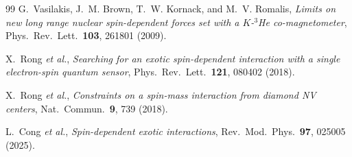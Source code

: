 \documentclass[12pt,a4paper]{report}
\begin{document}
\begin{thebibliography}{99}
G.~Vasilakis, J.~M. Brown, T.~W. Kornack, and M.~V. Romalis,
\textit{Limits on new long range nuclear spin-dependent forces set with a
$K$-$^{3}$He co-magnetometer},
Phys.\ Rev.\ Lett.\ \textbf{103}, 261801 (2009).

X.~Rong \textit{et al.},
\textit{Searching for an exotic spin-dependent interaction with a single
electron-spin quantum sensor},
Phys.\ Rev.\ Lett.\ \textbf{121}, 080402 (2018).

X.~Rong \textit{et al.},
\textit{Constraints on a spin-mass interaction from diamond NV centers},
Nat.\ Commun.\ \textbf{9}, 739 (2018).

L.~Cong \textit{et al.},
\textit{Spin-dependent exotic interactions},
Rev.\ Mod.\ Phys.\ \textbf{97}, 025005 (2025).

\end{thebibliography}
\end{document}
